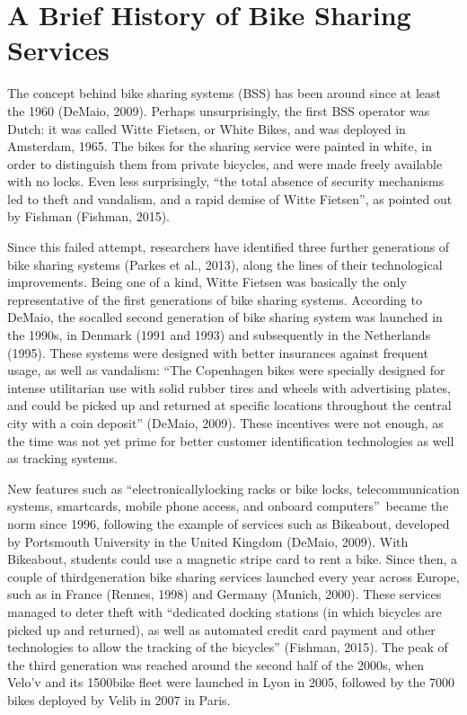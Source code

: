 \documentclass[letterpaper,10pt,english]{jupyterBook}
\begin{document}
\section{A Brief History of Bike Sharing Services}
\label{\detokenize{02-bikesharing_and_bikemi:a-brief-history-of-bike-sharing-services}}
\sphinxAtStartPar
The concept behind bike sharing systems (BSS) has been around since at least the 1960 (DeMaio, 2009). Perhaps unsurprisingly, the first BSS operator was Dutch: it was called Witte Fietsen, or White Bikes, and was deployed in Amsterdam, 1965. The bikes for the sharing service were painted in white, in order to distinguish them from private bicycles, and were made freely available with no locks. Even less surprisingly, “the total absence of security mechanisms led to theft and vandalism, and a rapid demise of Witte Fietsen”, as pointed out by Fishman (Fishman, 2015).

\sphinxAtStartPar
Since this failed attempt, researchers have identified three further generations of bike sharing systems (Parkes et al., 2013), along the lines of their technological improvements. Being one of a kind, Witte Fietsen was basically the only representative of the first generations of bike sharing systems. According to DeMaio, the so\sphinxhyphen{}called second generation of bike sharing system was launched in the 1990s, in Denmark (1991 and 1993) and subsequently in the Netherlands (1995). These systems were designed with better insurances against frequent usage, as well as vandalism: “The Copenhagen bikes were specially designed for intense utilitarian use with solid rubber tires and wheels with advertising plates, and could be picked up and returned at specific locations throughout the central city with a coin deposit” (DeMaio, 2009). These incentives were not enough, as the time was not yet prime for better customer identification technologies as well as tracking systems.

\sphinxAtStartPar
New features such as “electronically\sphinxhyphen{}locking racks or bike locks, telecommunication systems, smart\sphinxhyphen{}cards, mobile phone access, and on\sphinxhyphen{}board computers” became the norm since 1996, following the example of services such as Bikeabout, developed by Portsmouth University in the United Kingdom (DeMaio, 2009). With Bikeabout, students could use a magnetic stripe card to rent a bike. Since then, a couple of third\sphinxhyphen{}generation bike sharing services launched every year across Europe, such as in France (Rennes, 1998) and Germany (Munich, 2000). These services managed to deter theft with “dedicated docking stations (in which bicycles are picked up and returned), as well as automated credit card payment and other technologies to allow the tracking of the bicycles” (Fishman, 2015). The peak of the third generation was reached around the second half of the 2000s, when Velo’v and its 1500\sphinxhyphen{}bike fleet were launched in Lyon in 2005, followed by the 7000 bikes deployed by Velib in 2007 in Paris.
\end{document}
